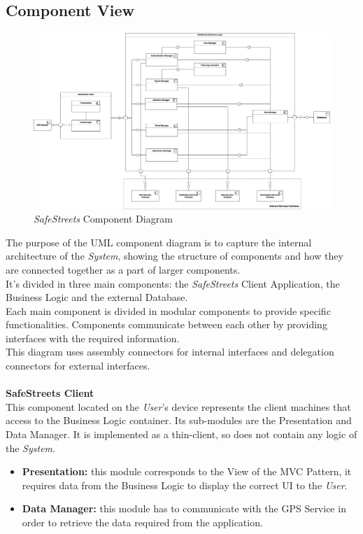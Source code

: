 \documentclass{article}
\begin{document}
	\subsection{Component View}
		\begin{figure}[H]
			\centering
			\includegraphics[scale=0.20]{Images/Diagrams/component_diagram.png}
			\caption{{\it SafeStreets} Component Diagram}
		\end{figure}
		The purpose of the UML component diagram is to capture the internal architecture of the {\it System}, showing the structure of components and how they are connected together as a part of larger components. \\
		It's divided in three main components: the {\it SafeStreets} Client Application, the Business Logic and the external Database. \\ 
		Each main component is divided in modular components to provide specific functionalities. Components communicate between each other by providing interfaces with the required information. \\
		This diagram uses assembly connectors for internal interfaces and delegation connectors for external interfaces. 
		\\ \\
		{\bf SafeStreets Client} \\
		This component located on the {\it User}'s device represents the client machines that access to the Business Logic container. Its sub-modules are the Presentation and Data Manager. It is implemented as a thin-client, so does not contain any logic of the {\it System}.
		\begin{itemize}
		\item {\bf Presentation:} this module corresponds to the View of the MVC Pattern, it requires data from the Business Logic to display the correct UI to the {\it User}.
		\item {\bf Data Manager:} this module has to communicate with the GPS Service in order to retrieve the data required from the application. 
		\end{itemize} 
\end{document}
